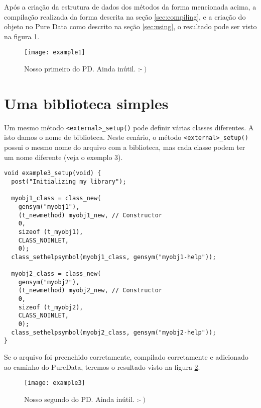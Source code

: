 Após a criação da estrutura de dados dos métodos da forma mencionada acima, a
compilação realizada da forma descrita na seção \ref{sec:compiling}, e a
criação do objeto no Pure Data como descrito na seção \ref{sec:using}, o
resultado pode ser visto na figura \ref{fig:example01working}.

\begin{figure}[h!]
  \centering
  \texttt{[image: example1]}
  \caption{Nosso primeiro \external do PD. Ainda inútil. :-$\left.\right)$}
  \label{fig:example01working}
\end{figure}

\section{Uma biblioteca simples}

Um mesmo método \texttt{<external>\_setup()} pode definir várias classes
diferentes. A isto damos o nome de biblioteca. Neste cenário, o método
\texttt{<external>\_setup()} possui o mesmo nome do arquivo com a biblioteca,
mas cada classe podem ter um nome diferente (veja o exemplo 3).

\vspace{1em}
\begin{lstlisting}[caption=Exemplo de arquivo com duas classes]
void example3_setup(void) {
  post("Initializing my library");

  myobj1_class = class_new(
    gensym("myobj1"),
    (t_newmethod) myobj1_new, // Constructor
    0,
    sizeof (t_myobj1),
    CLASS_NOINLET,
    0);
  class_sethelpsymbol(myobj1_class, gensym("myobj1-help"));

  myobj2_class = class_new(
    gensym("myobj2"),
    (t_newmethod) myobj2_new, // Constructor
    0,
    sizeof (t_myobj2),
    CLASS_NOINLET,
    0);
  class_sethelpsymbol(myobj2_class, gensym("myobj2-help"));
}
\end{lstlisting}

Se o arquivo foi preenchido corretamente, compilado corretamente e adicionado
ao caminho do PureData, teremos o resultado visto na figura \ref{fig:exemplo3}.

\begin{figure}[h!]
	\centering
	\texttt{[image: example3]}
	\caption{Nosso segundo \external do PD. Ainda inútil. :-$\left.\right)$}
        \label{fig:exemplo3}
\end{figure}


